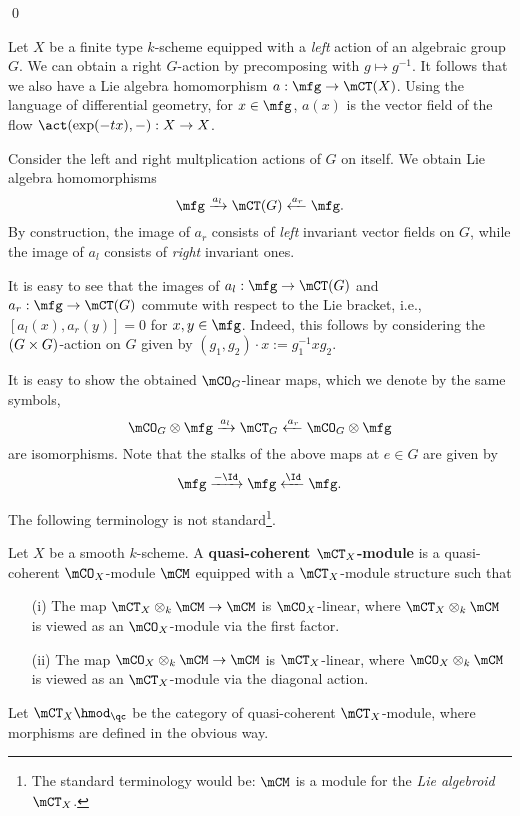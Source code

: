 	\qed

	\begin{rem}
		Let $X$ be a finite type $k$-scheme equipped with a \emph{left} action of an algebraic group $G$. We can obtain a right $G$-action by precomposing with $g\mapsto g^{-1}$. It follows that we also have a Lie algebra homomorphism $a: \mfg\to \mCT(X)$. Using the language of differential geometry, for $x\in \mfg$, $a(x)$ is the vector field of the flow $\act(\exp(-tx),-): X \to X$. 

	\end{rem}


	\begin{exam}
		Consider the left and right multplication actions of $G$ on itself. We obtain Lie algebra homomorphisms
		\[
			\mfg \xrightarrow{a_l} \mCT(G) \xleftarrow{a_r} \mfg.
		\]
		By construction, the image of $a_r$ consists of \emph{left} invariant vector fields on $G$, while the image of $a_l$ consists of \emph{right} invariant ones. 

		It is easy to see that the images of $a_l: \mfg \to \mCT(G)$ and $a_r: \mfg \to \mCT(G)$ commute with respect to the Lie bracket, i.e., $[a_l(x), a_r(y)] = 0$ for $x,y\in \mfg$. Indeed, this follows by considering the $(G\mt G)$-action on $G$ given by $(g_1,g_2)\cdot x := g_1^{-1}xg_2$.

		It is easy to show the obtained $\mCO_G$-linear maps, which we denote by the same symbols,
		\[
			\mCO_G \ot \mfg \xrightarrow{a_l} \mCT_G \xleftarrow{a_r} \mCO_G \ot \mfg
		\]
		are isomorphisms. Note that the stalks of the above maps at $e\in G$ are given by
		\[
			\mfg \xrightarrow{ -\Id } \mfg \xleftarrow{\Id} \mfg.
		\]
	\end{exam}


	The following terminology is not standard\footnote{The standard terminology would be: $\mCM$ is a module for the \emph{Lie algebroid $\mCT_{X}$}.}.

	\begin{defn}
		Let $X$ be a smooth $k$-scheme. A \textbf{quasi-coherent $\mCT_{X}$-module} is a quasi-coherent $\mCO_X$-module $\mCM$ equipped with a $\mCT_{X}$-module structure such that 
		\begin{itemize}
			\item[(i)]
				The map $\mCT_X\ot_k \mCM \to \mCM$ is $\mCO_X$-linear, where $\mCT_X\ot_k \mCM$ is viewed as an $\mCO_X$-module via the first factor.
			\item[(ii)]
				The map $\mCO_X \ot_k \mCM \to \mCM$ is $\mCT_{X}$-linear, where $\mCO_X \ot_k \mCM $ is viewed as an $\mCT_X$-module via the diagonal action.
		\end{itemize}
		Let $\mCT_X\hmod_\qc$ be the category of quasi-coherent $\mCT_{X}$-module, where morphisms are defined in the obvious way.
	\end{defn}

